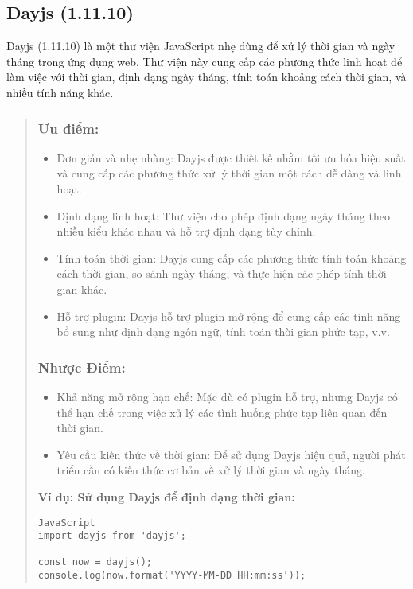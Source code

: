 \subsection{Dayjs (1.11.10)}
Dayjs (1.11.10) là một thư viện JavaScript nhẹ dùng để xử lý thời gian và ngày tháng trong ứng dụng web. Thư viện này cung cấp các phương thức linh hoạt để làm việc với thời gian, định dạng ngày tháng, tính toán khoảng cách thời gian, và nhiều tính năng khác.

\begin{quote}
\subsubsection{Ưu điểm:}
\begin{itemize}
  \item Đơn giản và nhẹ nhàng: Dayjs được thiết kế nhằm tối ưu hóa hiệu suất và cung cấp các phương thức xử lý thời gian một cách dễ dàng và linh hoạt.
  \item Định dạng linh hoạt: Thư viện cho phép định dạng ngày tháng theo nhiều kiểu khác nhau và hỗ trợ định dạng tùy chỉnh.
  \item Tính toán thời gian: Dayjs cung cấp các phương thức tính toán khoảng cách thời gian, so sánh ngày tháng, và thực hiện các phép tính thời gian khác.
  \item Hỗ trợ plugin: Dayjs hỗ trợ plugin mở rộng để cung cấp các tính năng bổ sung như định dạng ngôn ngữ, tính toán thời gian phức tạp, v.v.
\end{itemize}

\subsubsection{Nhược Điểm:}
\begin{itemize}
  \item Khả năng mở rộng hạn chế: Mặc dù có plugin hỗ trợ, nhưng Dayjs có thể hạn chế trong việc xử lý các tình huống phức tạp liên quan đến thời gian.
  \item Yêu cầu kiến thức về thời gian: Để sử dụng Dayjs hiệu quả, người phát triển cần có kiến thức cơ bản về xử lý thời gian và ngày tháng.
\end{itemize}

\textbf{Ví dụ: Sử dụng Dayjs để định dạng thời gian:}
\begin{lstlisting}
JavaScript
import dayjs from 'dayjs';

const now = dayjs();
console.log(now.format('YYYY-MM-DD HH:mm:ss'));
\end{lstlisting}
\end{quote}





